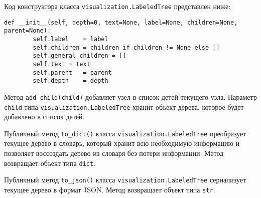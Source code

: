 Код конструктора класса \texttt{visualization.LabeledTree} представлен ниже:
\medskip
\begin{lstlisting}[style=Python]
    def __init__(self, depth=0, text=None, label=None, children=None, parent=None):
        self.label    = label
        self.children = children if children != None else []
        self.general_children = []
        self.text = text
        self.parent   = parent
        self.depth    = depth
\end{lstlisting}
\medskip

Метод \texttt{add\_child(child)} добавляет узел в список детей текущего узла. Параметр \texttt{child} типа \texttt{vi\-sualization.LabeledTree} хранит объект дерева, которое будет добавлено в список детей.

Публичный метод \texttt{to\_dict()} класса \texttt{visualization.Labeled\-Tree} преобразует текущее дерево в словарь, который хранит всю необходимую информацию и позволяет воссоздать дерево из словаря без потери информации. Метод возвращает объект типа \texttt{dict}.

Публичный метод \texttt{to\_json()} класса \texttt{visualization.Labeled\-Tree} сериализует текущее дерево в формат JSON. Метод возвращает объект типа \texttt{str}.